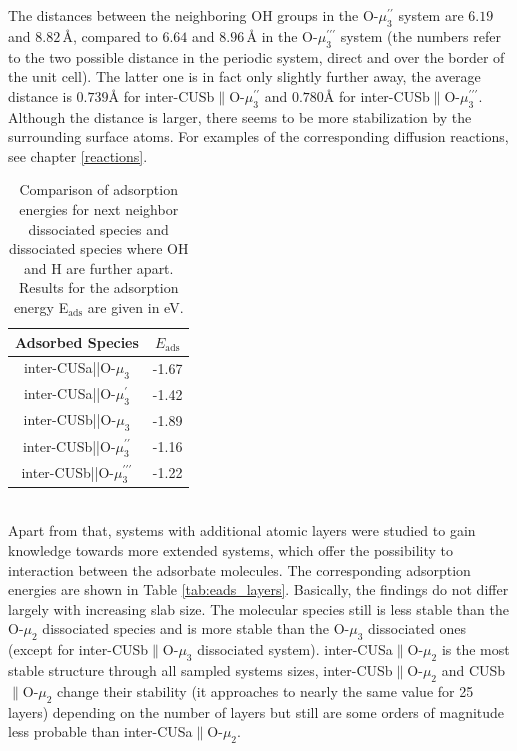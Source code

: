 \documentclass[11pt,DIV=13,BCOR=5mm,a4paper,headinclude]{scrbook}
\begin{document}
The distances between the neighboring OH groups in the O-$\mu_3^{\prime\prime}$ system are $6.19$ and $8.82\,$\AA{}, compared to $6.64$ and $8.96\,$\AA{} in the O-$\mu_3^{\prime\prime\prime}$ system (the numbers refer to the two possible distance in the periodic system, direct and over the border of the unit cell).
The latter one is in fact only slightly further away, the average distance is $0.739$\AA{} for inter-CUSb$\parallel$O-$\mu_3^{\prime\prime}$ and $0.780$\AA{} for inter-CUSb$\parallel$O-$\mu_3^{\prime\prime\prime}$.
Although the distance is larger, there seems to be more stabilization by the surrounding surface atoms.
For examples of the corresponding  diffusion reactions, see chapter \ref{reactions}.
\begin{table}[!ht]
  \centering
 \caption{Comparison of adsorption energies for next neighbor dissociated species and dissociated species where OH and H are further apart.
Results for the adsorption energy E$_\textrm{ads}$ are given in eV.
\vspace*{.2cm} 
  }
  \begin{tabular}{cc}
  \toprule
  Adsorbed Species  & $E_\text{ads}$  \\\midrule
   inter-CUSa||O-$\mu_3$ & -1.67 \\
   inter-CUSa||O-$\mu_3^\prime$ & -1.42 \\\hline
   inter-CUSb||O-$\mu_3$ & -1.89\\
   inter-CUSb||O-$\mu_3^{\prime\prime}$ & -1.16\\
   inter-CUSb||O-$\mu_3^{\prime\prime\prime}$ & -1.22\\\bottomrule
  \end{tabular}
  \label{tab:ads_1waterfurther}
\end{table}
\\
Apart from that, systems with additional atomic layers were studied to gain knowledge towards more extended systems, which offer the possibility to interaction between the adsorbate molecules.
The corresponding adsorption energies are shown in Table \ref{tab:eads_layers}.
Basically, the findings do not differ largely with increasing slab size.
The molecular species still is less stable than the O-$\mu_2$ dissociated species and is more stable than the O-$\mu_3$ dissociated ones (except for inter-CUSb$\parallel$O-$\mu_3$ dissociated system).
inter-CUSa$\parallel$O-$\mu_2$ is the most stable structure through all sampled systems sizes, inter-CUSb$\parallel$O-$\mu_2$ and CUSb$\parallel$O-$\mu_2$ change their stability (it approaches to nearly the same value for 25 layers) depending on the number of layers but still are some orders of magnitude less probable than inter-CUSa$\parallel$O-$\mu_2$.
\end{document}
